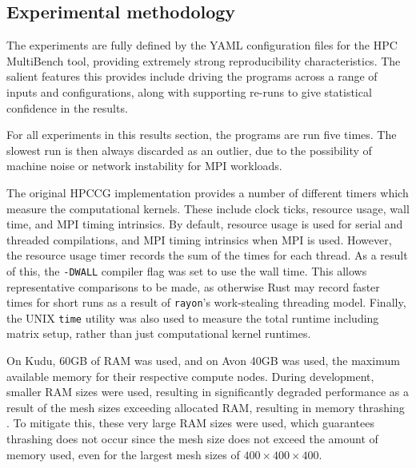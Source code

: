 \subsection{Experimental methodology}
\label{ssec:experimental-methodology}


The experiments are fully defined by the YAML configuration files for the HPC MultiBench tool, providing extremely strong reproducibility characteristics. The salient features this provides include driving the programs across a range of inputs and configurations, along with supporting re-runs to give statistical confidence in the results.

For all experiments in this results section, the programs are run five times. The slowest run is then always discarded as an outlier, due to the possibility of machine noise or network instability for MPI workloads.

The original HPCCG implementation provides a number of different timers which measure the computational kernels. These include clock ticks, resource usage, wall time, and MPI timing intrinsics. By default, resource usage is used for serial and threaded compilations, and MPI timing intrinsics when MPI is used. However, the resource usage timer records the sum of the times for each thread. As a result of this, the \texttt{-DWALL} compiler flag was set to use the wall time. This allows representative comparisons to be made, as otherwise Rust may record faster times for short runs as a result of \texttt{rayon}'s work-stealing threading model. Finally, the UNIX \texttt{time} utility was also used to measure the total runtime including matrix setup, rather than just computational kernel runtimes.

On Kudu, 60GB of RAM was used, and on Avon 40GB was used, the maximum available memory for their respective compute nodes. During development, smaller RAM sizes were used, resulting in significantly degraded performance as a result of the mesh sizes exceeding allocated RAM, resulting in memory thrashing \cite{pattersonHennessyComputerOrganisationArchitecture}. To mitigate this, these very large RAM sizes were used, which guarantees thrashing does not occur since the mesh size does not exceed the amount of memory used, even for the largest mesh sizes of $400 \times 400 \times 400$.


